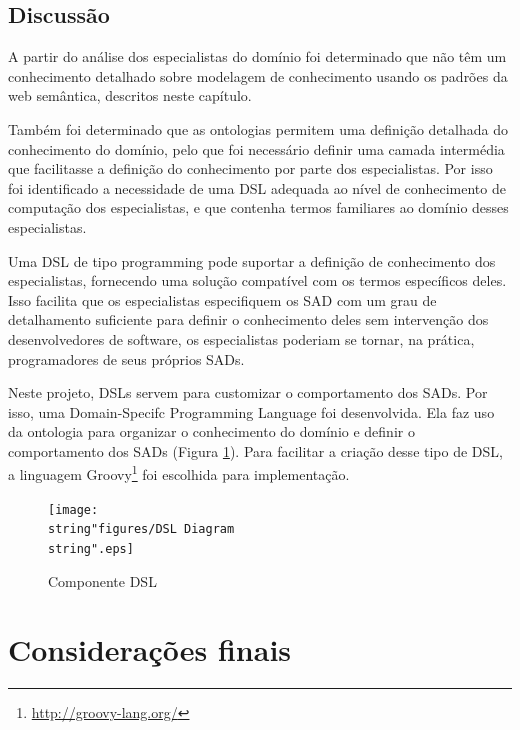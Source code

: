 \subsection*{Discussão}

A partir do análise dos especialistas do domínio foi determinado que
não têm um conhecimento detalhado sobre modelagem de conhecimento
usando os padrões da web semântica, descritos neste capítulo. 

Também foi determinado que as ontologias permitem uma definição detalhada
do conhecimento do domínio, pelo que foi necessário definir uma camada
intermédia que facilitasse a definição do conhecimento por parte dos
especialistas. Por isso foi identificado a necessidade de uma DSL
adequada ao nível de conhecimento de computação dos especialistas,
e que contenha termos familiares ao domínio desses especialistas. 

Uma DSL de tipo \foreignlanguage{english}{programming} pode suportar
a definição de conhecimento dos especialistas, fornecendo uma solução
compatível com os termos específicos deles. Isso facilita que os especialistas
especifiquem os SAD com um grau de detalhamento suficiente para definir
o conhecimento deles sem intervenção dos desenvolvedores de software,
os especialistas poderiam se tornar, na prática, programadores de
seus próprios SADs.

Neste projeto, DSLs servem para customizar o comportamento dos SADs.
Por isso, uma \foreignlanguage{english}{Domain-Specifc Programming
Language }foi desenvolvida. Ela faz uso da ontologia para organizar
o conhecimento do domínio e definir o comportamento dos SADs (Figura
\ref{fig:Componente-DSL}). Para facilitar a criação desse tipo de
DSL, a linguagem \foreignlanguage{english}{Groovy}\footnote{%
\url{http://groovy-lang.org/}%
} foi escolhida para implementação. 

\begin{figure}[H]
\begin{centering}
\texttt{[image: \\string"figures/DSL Diagram\\string".eps]}
\par\end{centering}
\caption{Componente DSL \label{fig:Componente-DSL}}
\end{figure}


\section{Considerações finais}

